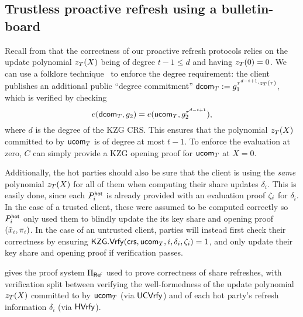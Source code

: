 \subsection{Trustless proactive refresh using a bulletin-board}\label{sec:fs_protocol}

Recall from  that the correctness of our proactive refresh protocols relies on the update polynomial $z_{T}(X)$ being of degree $t-1 \leq d$ and having $z_{T}(0)=0$. 
We can use a folklore technique~\cite[\S2.5]{EC:CHMMVW20} 
to enforce the degree requirement: the client publishes an additional public ``degree commitment'' $\mathsf{dcom}_{T} := g_1^{\tau^{d-t+1} \cdot z_{T}(\tau)}$, %
which is verified by checking
\[
    e(\dcom_\timeT, g_2) = e(\ucom_\timeT, g_2^{\tau^{d-t+1}}), %
\]
where $d$ is the degree of the KZG CRS. This ensures that the polynomial $z_{T}(X)$ committed to by $\mathsf{ucom}_{T}$ is of degree at most $t-1$. To enforce the evaluation at zero, $C$ can simply provide a KZG opening proof for $\mathsf{ucom}_{T}$ at $X=0$.

Additionally, the hot parties should also be sure that the client is using the \emph{same} polynomial $z_{T}(X)$ for all of them when computing their share updates $\delta_i$. This is easily done, since each $P_i^{\mathsf{hot}}$ is already provided with an evaluation proof $\zeta_i$ for $\delta_i$. In the case of a trusted client, these were assumed to be computed correctly so $P_i^{\mathsf{hot}}$ only used them to blindly update the its key share and opening proof $(\tilde{x}_i, \pi_i)$. In the case of an untrusted client, parties will instead first check their correctness by ensuring $\mathsf{KZG}.\mathsf{Vrfy}(\mathsf{crs}, \mathsf{ucom}_{T}, i, \delta_i, \zeta_i) = 1$, and only update their key share and opening proof if verification passes.


 gives the proof system $\Pi_{\sf Ref}$ used to prove correctness of share refreshes, with verification split between verifying the well-formedness of the update polynomial $z_{T}(X)$ committed to by ${\sf u}\mathsf{com}_{T}$ (via ${\sf UC}\mathsf{Vrfy}$) and of each hot party's refresh information $\delta_i$ (via ${\sf H}\mathsf{Vrfy}$).

